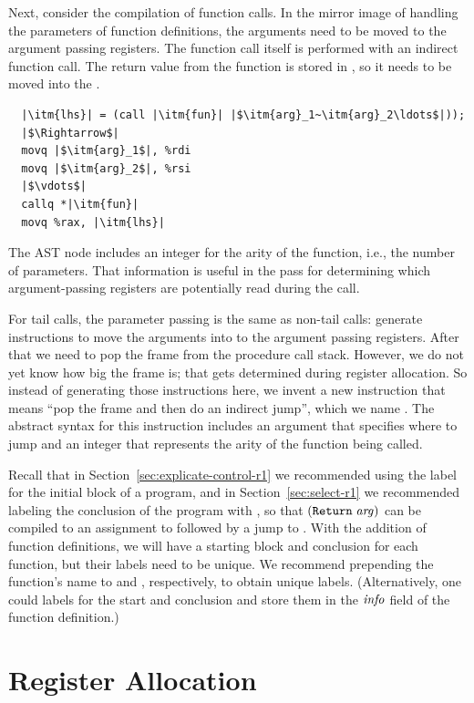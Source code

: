 \documentclass[11pt]{book}
\begin{document}
Next, consider the compilation of function calls. In the mirror image
of handling the parameters of function definitions, the arguments need
to be moved to the argument passing registers.  The function call
itself is performed with an indirect function call. The return value
from the function is stored in , so it needs to be moved
into the .
\begin{lstlisting}
  |\itm{lhs}| = (call |\itm{fun}| |$\itm{arg}_1~\itm{arg}_2\ldots$|));
  |$\Rightarrow$|
  movq |$\itm{arg}_1$|, %rdi
  movq |$\itm{arg}_2$|, %rsi
  |$\vdots$|
  callq *|\itm{fun}|
  movq %rax, |\itm{lhs}|
\end{lstlisting}
The  AST node includes an integer for the arity of
the function, i.e., the number of parameters. That information is
useful in the  pass for determining which
argument-passing registers are potentially read during the call.

For tail calls, the parameter passing is the same as non-tail calls:
generate instructions to move the arguments into to the argument
passing registers.  After that we need to pop the frame from the
procedure call stack.  However, we do not yet know how big the frame
is; that gets determined during register allocation. So instead of
generating those instructions here, we invent a new instruction that
means ``pop the frame and then do an indirect jump'', which we name
. The abstract syntax for this instruction includes an
argument that specifies where to jump and an integer that represents
the arity of the function being called.

Recall that in Section~\ref{sec:explicate-control-r1} we recommended
using the label  for the initial block of a program, and
in Section~\ref{sec:select-r1} we recommended labeling the conclusion
of the program with , so that $(\texttt{Return}\;\mathit{arg})$
can be compiled to an assignment to  followed by a jump to
. With the addition of function definitions, we will
have a starting block and conclusion for each function, but their
labels need to be unique. We recommend prepending the function's name
to  and , respectively, to obtain unique
labels. (Alternatively, one could  labels for the start
and conclusion and store them in the $\mathit{info}$ field of the
function definition.)


\section{Register Allocation}
\label{sec:register-allocation-r4}
\end{document}
